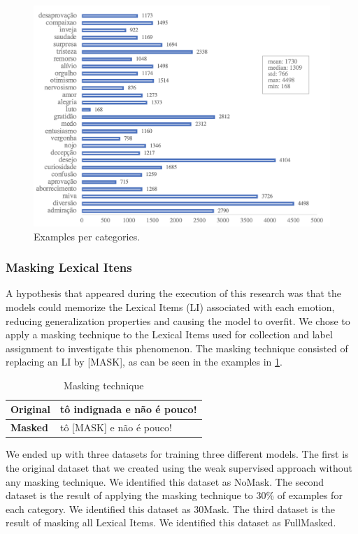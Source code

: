 \documentclass[12pt]{article}
\begin{document}
\begin{figure}[ht]
  \label{fig:example-per-category}
  \caption{Examples per categories.}
  \includegraphics[scale=0.7]{img-n-tables/qt-emotion2.png}
  \centering
\end{figure}

\subsubsection{Masking Lexical Itens}
A hypothesis that appeared during the execution of this research was that the models could memorize the Lexical Items (LI) associated with each emotion, reducing generalization properties and causing the model to overfit. We chose to apply a masking technique to the Lexical Items used for collection and label assignment to investigate this phenomenon. The masking technique consisted of replacing an LI by [MASK], as can be seen in the examples in \ref{tab:example-masked}.

\begin{table}[ht]
\label{tab:example-masked}
\caption{Masking technique}
\begin{tabular}{|l|l|}
\hline
\textbf{Original} & tô indignada e não é pouco! \\ \hline
\textbf{Masked} & tô {[}MASK{]} e não é pouco! \\ \hline
\end{tabular}
\centering
\end{table}

We ended up with three datasets for training three different models. The first is the original dataset that we created using the weak supervised approach without any masking technique. We identified this dataset as NoMask. The second dataset is the result of applying the masking technique to 30\% of examples for each category. We identified this dataset as 30Mask. The third dataset is the result of masking all Lexical Items. We identified this dataset as FullMasked.
\end{document}
